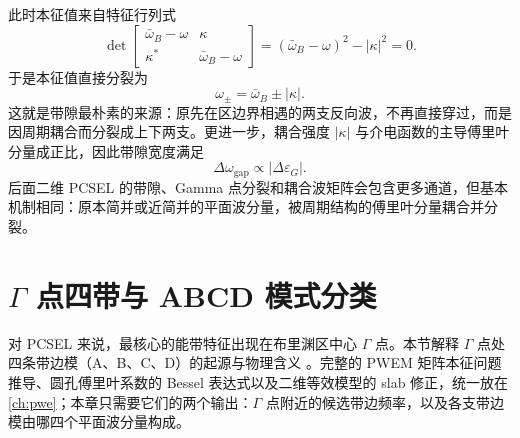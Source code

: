 此时本征值来自特征行列式
\begin{equation}
\det
\begin{bmatrix}
\bar{\omega}_B-\omega & \kappa \\
\kappa^\ast & \bar{\omega}_B-\omega
\end{bmatrix}
=
(\bar{\omega}_B-\omega)^2-|\kappa|^2
=0.
\label{eq:1d_bandgap_det}
\end{equation}
于是本征值直接分裂为
\begin{equation}
\omega_{\pm}=\bar{\omega}_B \pm |\kappa|.
\label{eq:1d_bandgap_split}
\end{equation}
这就是带隙最朴素的来源：原先在区边界相遇的两支反向波，不再直接穿过，而是因周期耦合而分裂成上下两支。更进一步，耦合强度 $|\kappa|$ 与介电函数的主导傅里叶分量成正比，因此带隙宽度满足
\begin{equation}
\Delta\omega_{\mathrm{gap}} \propto |\Delta\varepsilon_G|.
\label{eq:gap_vs_fourier}
\end{equation}
后面二维 PCSEL 的带隙、Gamma 点分裂和耦合波矩阵会包含更多通道，但基本机制相同：原本简并或近简并的平面波分量，被周期结构的傅里叶分量耦合并分裂。

\section{\texorpdfstring{$\Gamma$}{Gamma} 点四带与 ABCD 模式分类}

对 PCSEL 来说，最核心的能带特征出现在布里渊区中心 $\Gamma$ 点。本节解释 $\Gamma$ 点处四条带边模（A、B、C、D）的起源与物理含义 \cite{liang2012square}。完整的 PWEM 矩阵本征问题推导、圆孔傅里叶系数的 Bessel 表达式以及二维等效模型的 slab 修正，统一放在 \cref{ch:pwe}；本章只需要它们的两个输出：$\Gamma$ 点附近的候选带边频率，以及各支带边模由哪四个平面波分量构成。

